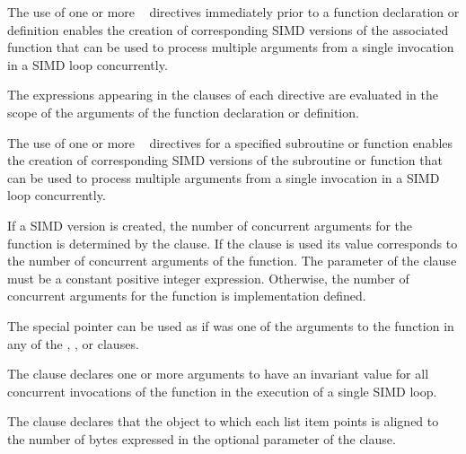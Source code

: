 \descr
\begin{ccppspecific}
The use of one or more ~ directives immediately prior
to a function declaration or definition enables the
creation of corresponding SIMD
versions of the associated function that can be used to process multiple arguments from
a single invocation in a SIMD loop concurrently.

The expressions appearing in the clauses of each directive are evaluated in the scope of
the arguments of the function declaration or definition.
\end{ccppspecific}

\begin{samepage}
\begin{fortranspecific}
The use of one or more ~ directives for a specified
subroutine or function enables the creation of corresponding SIMD versions of the
subroutine or function that can be used to process multiple arguments from a
single invocation in a SIMD loop concurrently.
\end{fortranspecific}
\end{samepage}

If a SIMD version is created, the number of concurrent arguments for the function is
determined by the  clause. If the  clause is used its value
corresponds to the number of concurrent arguments of the function. The parameter of
the  clause must be a constant positive integer expression. Otherwise, the
number of concurrent arguments for the function is implementation defined.

\begin{cppspecific}
The special  pointer can be used as if was one of the arguments to the function in any of the , , or  clauses.
\end{cppspecific}

The  clause declares one or more arguments to have an invariant value for all
concurrent invocations of the function in the execution of a single SIMD loop.

\begin{samepage}
\begin{ccppspecific}
The  clause declares that the object to which each list item points is aligned to
the number of bytes expressed in the optional parameter of the  clause.
\end{ccppspecific}
\end{samepage}

